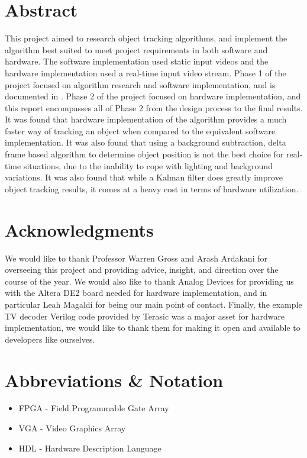 \documentclass[11pt]{article} %
\begin{document}
\section*{Abstract}
This project aimed to research object tracking algorithms, and implement the algorithm best suited to meet project requirements in both software and hardware. The software implementation used static input videos and the hardware implementation used a real-time input video stream. Phase 1 of the project focused on algorithm research and software implementation, and is documented in \cite{15}. Phase 2 of the project focused on hardware implementation, and this report encompasses all of Phase 2 from the design process to the final results. It was found that hardware implementation of the algorithm provides a much faster way of tracking an object when compared to the equivalent software implementation. It was also found that using a background subtraction, delta frame based algorithm to determine object position is not the best choice for real-time situations, due to the inability to cope with lighting and background variations. It was also found that while a Kalman filter does greatly improve object tracking results, it comes at a heavy cost in terms of hardware utilization.
\section*{Acknowledgments}
We would like to thank Professor Warren Gross and Arash Ardakani for overseeing this project and providing advice, insight, and direction over the course of the year. We would also like to thank Analog Devices for providing us with the Altera DE2 board needed for hardware implementation, and in particular Leah Magaldi for being our main point of contact. Finally, the example TV decoder Verilog code provided by Terasic was a major asset for hardware implementation, we would like to thank them for making it open and available to developers like ourselves. 
\pagebreak
\tableofcontents
\pagebreak
\section{Abbreviations \& Notation}
\begin{itemize}
\item[] FPGA - Field Programmable Gate Array
\item[] VGA - Video Graphics Array
\item[] HDL - Hardware Description Language
\end{itemize}
\end{document}
